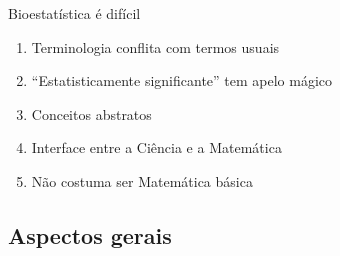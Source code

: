 \documentclass{beamer}
\begin{document}
\begin{frame}{\scriptsize Bioestatística é difícil}
  \begin{enumerate}
    \footnotesize
  \item Terminologia conflita com termos usuais
  \item ``Estatisticamente significante'' tem apelo mágico
  \item Conceitos abstratos
  \item Interface entre a Ciência e a Matemática
  \item Não costuma ser Matemática básica
  \end{enumerate}
\end{frame}

\subsection{Aspectos gerais}
\end{document}
